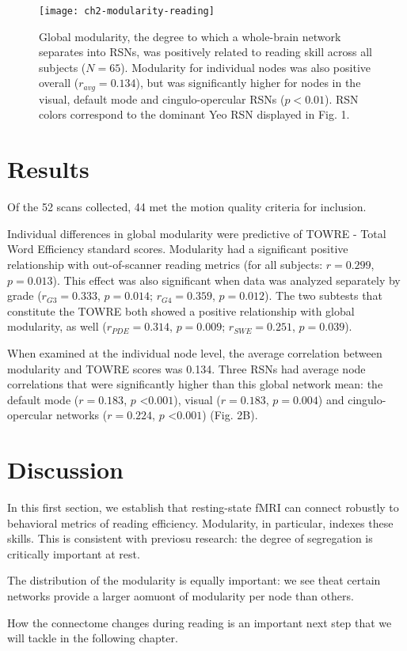 \begin{figure}[t]
    \centering
    \texttt{[image: ch2-modularity-reading]}
    \caption[Modularity metrics at rest predict reading skill.] {Global modularity, the degree to which a whole-brain network separates into RSNs, was positively related to reading skill across all subjects ($N = 65$). Modularity for individual nodes was also positive overall ($r_{avg} = 0.134$), but was significantly higher for nodes in the visual, default mode and cingulo-opercular RSNs ($p < 0.01$). RSN colors correspond to the dominant Yeo RSN displayed in Fig. 1.}
    \label{fig:ch2-modularity-reading}
\end{figure}

\section{Results} 

Of the 52 scans collected, 44 met the motion quality criteria for inclusion. 

Individual differences in global modularity were predictive of TOWRE - Total Word Efficiency standard scores. Modularity had a significant positive relationship with out-of-scanner reading metrics (for all subjects: $r = 0.299$, $p = 0.013$). This effect was also significant when data was analyzed separately by grade ($r_{G3} = 0.333$, $p = 0.014$; $r_{G4} = 0.359$, $p = 0.012$). The two subtests that constitute the TOWRE both showed a positive relationship with global modularity, as well ($r_{PDE} = 0.314$, $p = 0.009$; $r_{SWE} = 0.251$, $p = 0.039$). 

When examined at the individual node level, the average correlation between modularity and TOWRE scores was 0.134. Three RSNs had average node correlations that were significantly higher than this global network mean: the default mode ($r = 0.183$, $p$ \textless $0.001$), visual ($r = 0.183$, $p = 0.004$) and cingulo-opercular networks ($r = 0.224$, $p$ \textless $0.001$) (Fig. 2B). 

\section{Discussion}

In this first section, we establish that resting-state fMRI can connect robustly to behavioral metrics of reading efficiency. Modularity, in particular, indexes these skills. This is consistent with previosu research: the degree of segregation is critically important at rest. 

The distribution of the modularity is equally important: we see theat certain networks provide a larger aomuont of modularity per node than others. 

How the connectome changes during reading is an important next step that we will tackle in the following chapter.